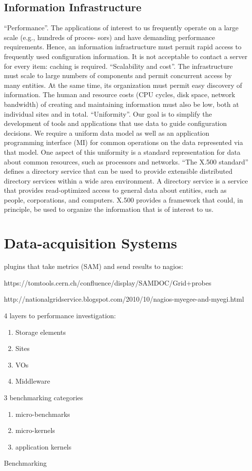 \subsection{Information Infrastructure}
``Performance''.  The applications of interest to us frequently 
operate on  a  large scale  (e.g.,  hundreds  of  proces- 
sors) and have demanding performance requirements. 
Hence, an information infrastructure must permit rapid 
access to frequently used configuration information. It 
is not acceptable to contact  a  server  for every  item: 
caching is required.
``Scalability and cost''. The infrastructure must scale to large
numbers of components and permit concurrent access
by many entities. At the same time, its organization
must permit easy discovery of information. The human
and resource costs (CPU cycles, disk space, network
bandwidth) of creating and maintaining information
must also be low, both at individual sites and in total.
``Uniformity''. Our goal is to simplify the development of
tools and applications that use data to guide configuration
decisions. We require a uniform data model
as well as an application programming interface (MI)
for common operations on the data represented via that
model. One aspect of this uniformity is a standard representation
for data about common resources, such as
processors and networks.
``The X.500 standard'' defines a directory service
that can be used to provide extensible distributed directory
services within a wide area environment. A directory service
is a service that provides read-optimized access to general
data about entities, such as people, corporations, and computers.
X.500 provides a framework that could, in principle,
be used to organize the information that is of interest to us.
\cite{mds1}
\newpage

\section{Data-acquisition Systems}
plugins that take metrics (SAM) and send results to nagios:

https://tomtools.cern.ch/confluence/display/SAMDOC/Grid+probes

http://nationalgridservice.blogspot.com/2010/10/nagios-myegee-and-myegi.html

4 layers to performance investigation:
\begin{enumerate}
  \item Storage elements
  \item Sites
  \item VOs
  \item Middleware
\end{enumerate}
3 benchmarking categories
\begin{enumerate}
  \item micro-benchmarks
  \item micro-kernels
  \item application kernels
\end{enumerate}
Benchmarking

